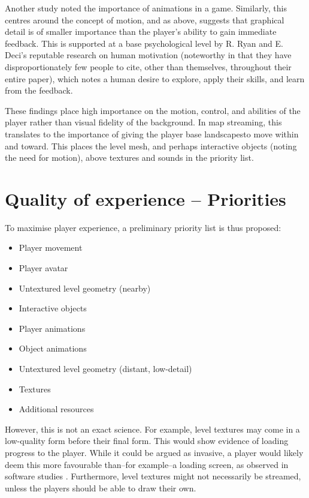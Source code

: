 \documentclass{scrartcl}
\begin{document}
Another study \cite{graphicsvsexperience} noted the importance of animations in a game. Similarly, this centres around the concept of motion, and as above, suggests that graphical detail is of smaller importance than the player's ability to gain immediate feedback. This is supported at a base psychological level by R. Ryan and E. Deci's reputable research on human motivation \cite{motivation} (noteworthy in that they have disproportionately few people to cite, other than themselves, throughout their entire paper), which notes a human desire to explore, apply their skills, and learn from the feedback.

These findings place high importance on the motion, control, and abilities of the player rather than visual fidelity of the background. In map streaming, this translates to the importance of giving the player base landscapesto move within and toward. This places the level mesh, and perhaps interactive objects (noting the need for motion), above textures and sounds in the priority list.

\section{Quality of experience -- Priorities}
To maximise player experience, a preliminary priority list is thus proposed:

\begin{itemize}
	\item Player movement
	\item Player avatar
	\item Untextured level geometry (nearby)
	\item Interactive objects
	\item Player animations
	\item Object animations
	\item Untextured level geometry (distant, low-detail)
	\item Textures
	\item Additional resources
\end{itemize}

However, this is not an exact science. For example, level textures may come in a low-quality form before their final form. This would show evidence of loading progress to the player. While it could be argued as invasive, a player would likely deem this more favourable than--for example--a loading screen, as observed in software studies \cite{loadingscreens}. Furthermore, level textures might not necessarily be streamed, unless the players should be able to draw their own.
\end{document}
